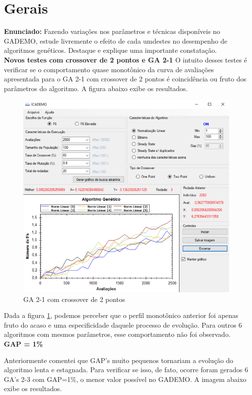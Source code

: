 \documentclass[12pt]{article}
\begin{document}
\section{Gerais}
\textbf{Enunciado:}
Fazendo variações nos parâmetros e técnicas disponíveis no GADEMO, estude livremente o efeito de cada umdestes no desempenho de algoritmos genéticos. Destaque e explique uma importante constatação.\\


\textbf{Novos testes com crossover de 2 pontos e GA 2-1}
O intuito desses testes é verificar se o comportamento quase monotônico da curva de avaliações apresentada para o GA 2-1 com crossover de 2 pontos é coincidência ou fruto dos parâmetros do algoritmo. A figura abaixo exibe os resultados.

\begin{figure}[H]
	\centering
	\includegraphics[width=0.7\linewidth]{Imagens/questao8_2pontos}
	\caption{GA 2-1 com crossover de 2 pontos}
	\label{fig:questao82pontos}
\end{figure}

Dada a figura \ref{fig:questao82pontos}, podemos perceber que o perfil monotônico anterior foi apenas fruto do acaso e uma especificidade daquele processo de evolução. Para outros 6 algoritmos com mesmos parâmetros, esse comportamento não foi observado.\\

\textbf{GAP = 1\%}

Anteriormente comentei que GAP's muito pequenos tornariam a evolução do algoritmo lenta e estagnada. Para verificar se isso, de fato, ocorre foram gerados 6 GA's 2-3 com GAP=1\%, o menor valor possível no GADEMO. A imagem abaixo exibe os resultados.
\end{document}
